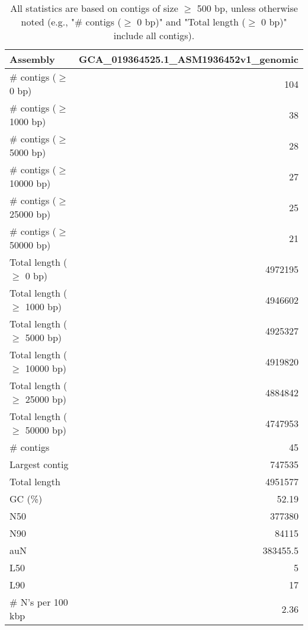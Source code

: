 \documentclass[12pt,a4paper]{article}
\begin{document}
\begin{table}[ht]
\begin{center}
\caption{All statistics are based on contigs of size $\geq$ 500 bp, unless otherwise noted (e.g., "\# contigs ($\geq$ 0 bp)" and "Total length ($\geq$ 0 bp)" include all contigs).}
\begin{tabular}{|l*{1}{|r}|}
\hline
Assembly & GCA\_019364525.1\_ASM1936452v1\_genomic \\ \hline
\# contigs ($\geq$ 0 bp) & 104 \\ \hline
\# contigs ($\geq$ 1000 bp) & 38 \\ \hline
\# contigs ($\geq$ 5000 bp) & 28 \\ \hline
\# contigs ($\geq$ 10000 bp) & 27 \\ \hline
\# contigs ($\geq$ 25000 bp) & 25 \\ \hline
\# contigs ($\geq$ 50000 bp) & 21 \\ \hline
Total length ($\geq$ 0 bp) & 4972195 \\ \hline
Total length ($\geq$ 1000 bp) & 4946602 \\ \hline
Total length ($\geq$ 5000 bp) & 4925327 \\ \hline
Total length ($\geq$ 10000 bp) & 4919820 \\ \hline
Total length ($\geq$ 25000 bp) & 4884842 \\ \hline
Total length ($\geq$ 50000 bp) & 4747953 \\ \hline
\# contigs & 45 \\ \hline
Largest contig & 747535 \\ \hline
Total length & 4951577 \\ \hline
GC (\%) & 52.19 \\ \hline
N50 & 377380 \\ \hline
N90 & 84115 \\ \hline
auN & 383455.5 \\ \hline
L50 & 5 \\ \hline
L90 & 17 \\ \hline
\# N's per 100 kbp & 2.36 \\ \hline
\end{tabular}
\end{center}
\end{table}
\end{document}
